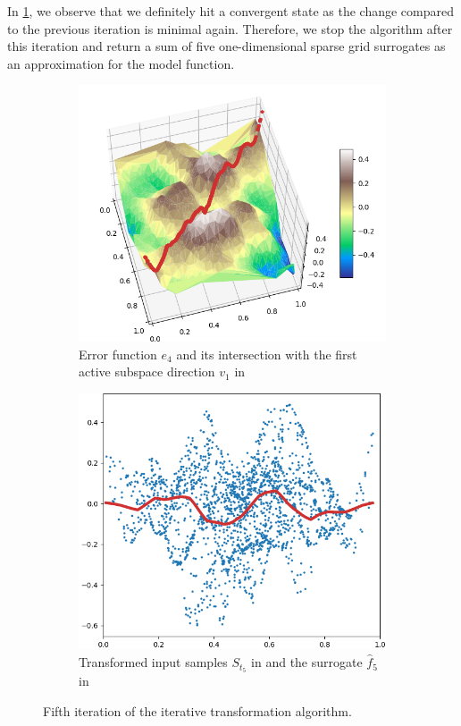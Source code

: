 \documentclass[
  a4paper,  %
  twoside,  %
  bibliography=totoc,
  headsepline,
  cleardoublepage=empty,
  parskip=half,
  draft=false
]{scrbook}
\begin{document}
\noindent
In \cref{fig:pipeline_5}, we observe that we definitely hit a convergent state as the change compared to the previous iteration is minimal again.
Therefore, we stop the algorithm after this iteration and return a sum of five one-dimensional sparse grid surrogates as an approximation for the model function.
\begin{mdframed}[style=style]
\begin{figure}[H]
\begin{subfigure}{.5\textwidth}
  \centering
  \includegraphics[width=.8\linewidth]{graphics/pipeline_current_5.png}
  \caption{Error function $e_4$ and its intersection with the first active subspace direction $v_1$ in \reddot}
\end{subfigure}%
\begin{subfigure}{.5\textwidth}
  \centering
  \includegraphics[width=.8\linewidth]{graphics/pipeline_local_5.png}
  \caption{Transformed input samples $S_{t_5}$ in \blue and the surrogate $\hat{f}_5$ in \reddot}
\end{subfigure}
\delimit
\caption{Fifth iteration of the iterative transformation algorithm.}
\label{fig:pipeline_5}
\end{figure}
\end{mdframed}
\end{document}
